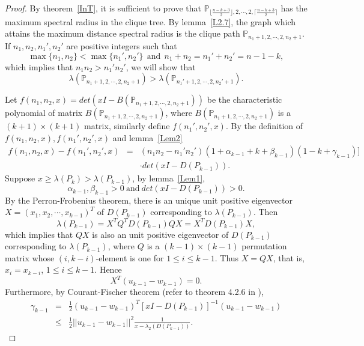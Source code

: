 \documentclass[10pt]{article}
\begin{document}
\begin{proof}
By theorem~\ref{InT}, it is sufficient to prove that $\mathbb{P}_{\lfloor \frac{n-k+3}{2}\rfloor,2,\cdots,2,\lceil \frac{n-k+3}{2}\rceil}$ has the maximum spectral radius in the clique tree. By lemma~\ref{L2.7}, the graph which attains the maximum distance spectral radius is the clique path $\mathbb{P}_{n_1+1,2,\cdots,2,n_2+1}$. If $n_1,n_2,n_1',n_2'$ are positive integers such that
\begin{equation}\label{Ceq}\max\{n_1,n_2\}<\max\{n_1',n_2'\} ~~\mbox{and}~~ n_1+n_2=n_1'+n_2'=n-1-k,\end{equation}
which implies that $n_1n_2>n_1'n_2'$, we will show that $$\lambda(\mathbb{P}_{n_1+1,2,\cdots,2,n_2+1})>\lambda(\mathbb{P}_{n_1'+1,2,\cdots,2,n_2'+1}).$$

Let $f(n_1,n_2,x)=det (x I -B(\mathbb{P}_{n_1+1,2,\cdots,2,n_2+1}))$ be the characteristic polynomial of matrix $B(\mathbb{P}_{n_1+1,2,\cdots,2,n_2+1})$, where $B(\mathbb{P}_{n_1+1,2,\cdots,2,n_2+1})$ is a $(k+1)\times (k+1)$ matrix, similarly define  $f(n_1',n_2',x)$.
By the definition of $f(n_1,n_2,x), f(n_1',n_2',x)$ and lemma~\ref{Lem2}
\begin{eqnarray}\label{MEQ}
f(n_1,n_2,x)-f(n_1',n_2',x)&=&(n_1n_2-n_1'n_2')(1+\alpha_{k-1}+k+\beta_{k-1} )(1-k+\gamma_{k-1})]\nonumber\\
&&\cdot det(x I-D(P_{k-1})).
\end{eqnarray}
Suppose $x\ge \lambda(P_{k})>\lambda(P_{k-1})$,  by lemma~\ref{Lem1},
\begin{equation}\label{Meq1}\alpha_{k-1},\beta_{k-1}>0~\mbox{and}~det(x I-D(P_{k-1}))>0.\end{equation}
By the Perron-Frobenius theorem, there is an unique unit positive eigenvector $X=(x_1,x_2,\cdots,x_{k-1})^T$ of $D(P_{k-1})$ corresponding to $\lambda(P_{k-1})$. Then
$$\lambda(P_{k-1})=X^TQ^T D(P_{k-1})QX=X^TD(P_{k-1})X,$$
which implies that $QX$ is also an unit positive eigenvector of $D(P_{k-1})$ corresponding to $\lambda(P_{k-1})$, where $Q$ is a $(k-1)\times (k-1)$ permutation matrix  whose $(i,k-i)$-element is one for $1\le i\le k-1$. Thus $X=QX$, that is, $x_i=x_{k-i}$, $1\le i\le k-1$. Hence
$$X^T(u_{k-1}-w_{k-1})=0. $$
Furthermore, by Courant-Fischer theorem (refer to theorem 4.2.6 in \cite{Horn}),
 \begin{eqnarray}\label{Meq4}
\gamma_{k-1}&=&\frac{1}{2}(u_{k-1}-w_{k-1})^T[x I-D(P_{k-1})]^{-1}(u_{k-1}-w_{k-1})\nonumber\\
&\le& \frac{1}{2}||u_{k-1}-w_{k-1}||^2\frac{1}{x -\lambda_2(D(P_{k-1}))}.

\end{eqnarray}
\end{proof}
\end{document}
